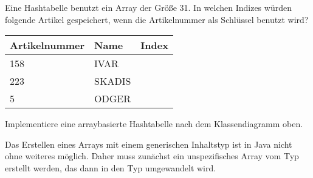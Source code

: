 \documentclass[10pt, a4paper]{scrartcl}
\begin{document}
\begin{center}
\end{center}

\begin{aufgabe}
	Eine Hashtabelle benutzt ein Array der Größe 31. In welchen Indizes würden folgende Artikel gespeichert, wenn die Artikelnummer als Schlüssel benutzt wird?
	
	\begin{tabularx}{\textwidth}{X|X|X}
		\textbf{Artikelnummer} & \textbf{Name} & \textbf{Index} \\\hline\hline
		158 & IVAR & \\\hline
		223 & SKADIS & \\\hline
		5 & ODGER &
	\end{tabularx}
\end{aufgabe}

\begin{aufgabe}
	Implementiere eine arraybasierte Hashtabelle nach dem Klassendiagramm oben.
	
	\begin{infobox}\small
Das Erstellen eines Arrays mit einem generischen Inhaltstyp ist in Java nicht ohne weiteres möglich. Daher muss zunächst ein unspezifisches Array vom Typ  erstellt werden, das dann in den Typ  umgewandelt wird.
	\begin{center}
	\end{center}
\end{infobox}
\end{aufgabe}
\end{document}
